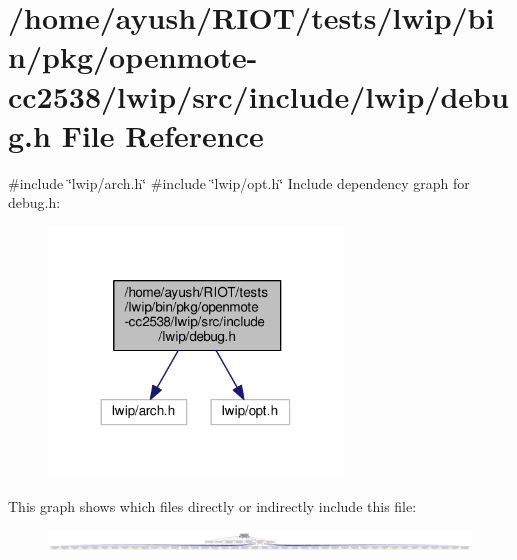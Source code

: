 \hypertarget{openmote-cc2538_2lwip_2src_2include_2lwip_2debug_8h}{}\section{/home/ayush/\+R\+I\+O\+T/tests/lwip/bin/pkg/openmote-\/cc2538/lwip/src/include/lwip/debug.h File Reference}
\label{openmote-cc2538_2lwip_2src_2include_2lwip_2debug_8h}
{\ttfamily \#include \char`\"{}lwip/arch.\+h\char`\"{}}\newline
{\ttfamily \#include \char`\"{}lwip/opt.\+h\char`\"{}}\newline
Include dependency graph for debug.\+h\+:
\nopagebreak
\begin{figure}[H]
\begin{center}
\leavevmode
\includegraphics[width=222pt]{openmote-cc2538_2lwip_2src_2include_2lwip_2debug_8h__incl}
\end{center}
\end{figure}
This graph shows which files directly or indirectly include this file\+:
\nopagebreak
\begin{figure}[H]
\begin{center}
\leavevmode
\includegraphics[width=350pt]{openmote-cc2538_2lwip_2src_2include_2lwip_2debug_8h__dep__incl}
\end{center}
\end{figure}
